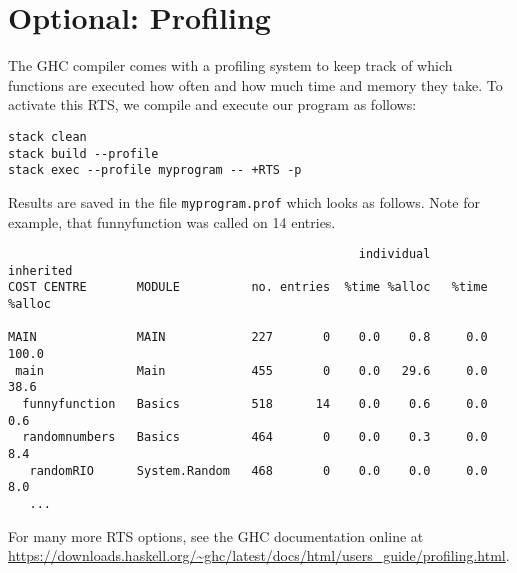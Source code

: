 
\section{Optional: Profiling}\label{sec:Profiling}

The GHC compiler comes with a profiling system to keep track of which
functions are executed how often and how much time and memory they take.
To activate this RTS, we compile and execute our program as follows:

\begin{verbatim}
stack clean
stack build --profile
stack exec --profile myprogram -- +RTS -p
\end{verbatim}

Results are saved in the file \texttt{myprogram.prof} which looks as follows.
Note for example, that funnyfunction was called on 14 entries.

\begin{small}
\begin{verbatim}
                                                 individual      inherited
COST CENTRE       MODULE          no. entries  %time %alloc   %time %alloc

MAIN              MAIN            227       0    0.0    0.8     0.0  100.0
 main             Main            455       0    0.0   29.6     0.0   38.6
  funnyfunction   Basics          518      14    0.0    0.6     0.0    0.6
  randomnumbers   Basics          464       0    0.0    0.3     0.0    8.4
   randomRIO      System.Random   468       0    0.0    0.0     0.0    8.0
   ...
\end{verbatim}
\end{small}

For many more RTS options, see the GHC documentation online at
\url{https://downloads.haskell.org/~ghc/latest/docs/html/users_guide/profiling.html}.

